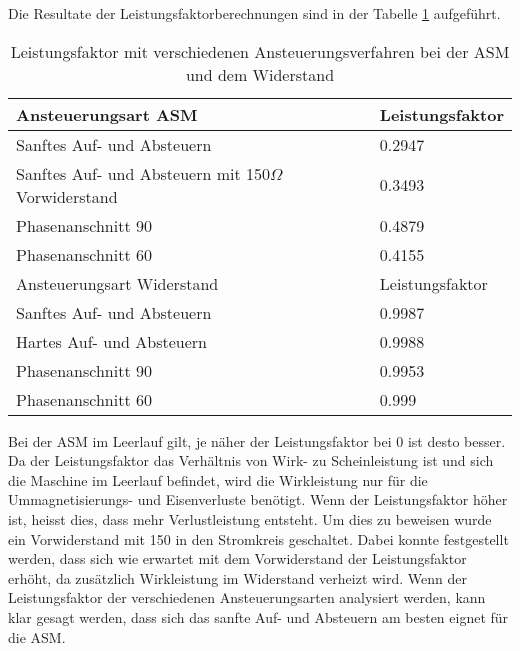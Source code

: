 Die Resultate der Leistungsfaktorberechnungen sind in der Tabelle \ref{tab:Leistungsfaktor_ASM_Widerstand} aufgeführt.

\begin{table}[ht!]
	\centering
	\begin{tabular}{|l|l|}
		\hline
		Ansteuerungsart ASM                                   		& Leistungsfaktor \\ \hline 
		Sanftes Auf- und Absteuern                          		& 0.2947          \\ \hline
		Sanftes Auf- und Absteuern mit 150$\Omega$ Vorwiderstand 	& 0.3493          \\ \hline
		Phasenanschnitt 90\textdegree                               & 0.4879          \\ \hline
		Phasenanschnitt 60\textdegree                               & 0.4155          \\ \hline \hline
		Ansteuerungsart Widerstand                            		& Leistungsfaktor \\ \hline 
		Sanftes Auf- und Absteuern                          		& 0.9987          \\ \hline
		Hartes Auf- und Absteuern                                   & 0.9988          \\ \hline
		Phasenanschnitt 90\textdegree                         		& 0.9953          \\ \hline
		Phasenanschnitt 60\textdegree                         		& 0.999           \\ \hline
	\end{tabular}
\caption{Leistungsfaktor mit verschiedenen Ansteuerungsverfahren bei der ASM und dem Widerstand}\label{tab:Leistungsfaktor_ASM_Widerstand}
\end{table}
Bei der ASM im Leerlauf gilt, je näher der Leistungsfaktor bei 0 ist desto besser. Da der Leistungsfaktor das Verhältnis von Wirk- zu Scheinleistung ist und sich die Maschine im Leerlauf befindet, wird die Wirkleistung nur für die Ummagnetisierungs- und Eisenverluste benötigt. Wenn der Leistungsfaktor höher ist, heisst dies, dass mehr Verlustleistung entsteht. Um dies zu beweisen wurde ein Vorwiderstand mit \SI{150}{\Omega} in den Stromkreis geschaltet. Dabei konnte festgestellt werden, dass sich wie erwartet mit dem Vorwiderstand der Leistungsfaktor erhöht, da zusätzlich Wirkleistung im Widerstand verheizt wird. Wenn der Leistungsfaktor der verschiedenen Ansteuerungsarten analysiert werden, kann klar gesagt werden, dass sich das sanfte Auf- und  Absteuern am besten eignet für die ASM.

